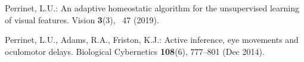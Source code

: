 \documentclass[runningheads]{llncs}
\begin{document}
\begin{thebibliography}{10}
  
  Perrinet, L.U.: An adaptive homeostatic algorithm for the unsupervised learning of visual features. Vision  \textbf{3}(3), ~47 (2019). %
  
  Perrinet, L.U., Adams, R.A., Friston, K.J.: Active inference, eye movements and oculomotor delays. Biological Cybernetics  \textbf{108}(6),  777--801 (Dec 2014). %
  
  

\end{thebibliography}
\end{document}
